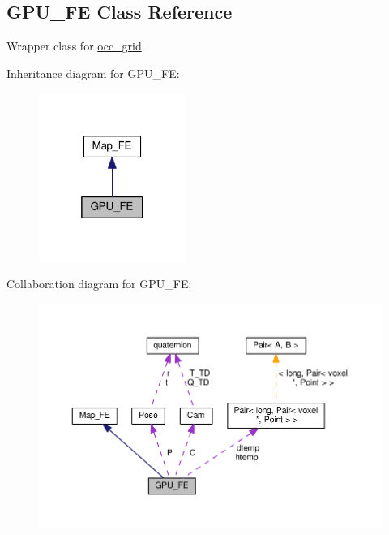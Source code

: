 \hypertarget{classGPU__FE}{}\subsection{G\+P\+U\+\_\+\+FE Class Reference}
\label{classGPU__FE}


Wrapper class for \hyperlink{classocc__grid}{occ\+\_\+grid}.  




Inheritance diagram for G\+P\+U\+\_\+\+FE\+:\nopagebreak
\begin{figure}[H]
\begin{center}
\leavevmode
\includegraphics[width=136pt]{classGPU__FE__inherit__graph}
\end{center}
\end{figure}


Collaboration diagram for G\+P\+U\+\_\+\+FE\+:\nopagebreak
\begin{figure}[H]
\begin{center}
\leavevmode
\includegraphics[width=350pt]{classGPU__FE__coll__graph}
\end{center}
\end{figure}
